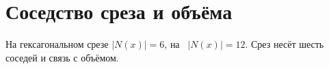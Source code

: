 \section{Соседство среза и объёма}

На гексагональном срезе $|N(x)|=6$, на \latGCK\ $|N(x)|=12$.
Срез несёт шесть соседей и связь с объёмом.

